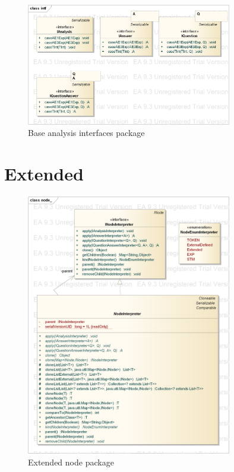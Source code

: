 \documentclass{overturerepchap}
\begin{document}
\begin{figure}[htb]
\centering
\includegraphics[width=0.8\textwidth]{figures/base_analysis_interfaces}
\caption{Base analysis interfaces package}
\end{figure}

\section{Extended}

\begin{figure}[htb]
\centering
\includegraphics[width=0.8\textwidth]{figures/extended_node}
\caption{Extended node package}
\end{figure}
\end{document}

